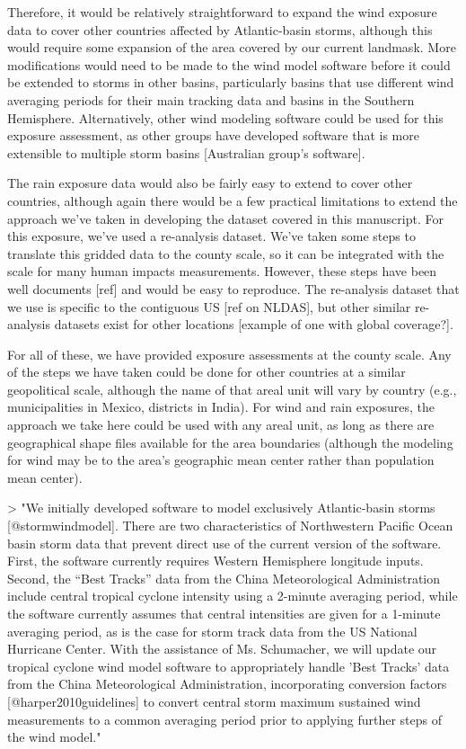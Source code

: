 Therefore, it would be relatively straightforward to expand the wind exposure
data to cover other countries affected by Atlantic-basin storms, although this
would require some expansion of the area covered by our current landmask. More
modifications would need to be made to the wind model software before it could
be extended to storms in other basins, particularly basins that use different
wind averaging periods for their main tracking data and basins in the Southern
Hemisphere. Alternatively, other wind modeling software could be used for this
exposure assessment, as other groups have developed software that is more
extensible to multiple storm basins [Australian group's software].

The rain exposure data would also be fairly easy to extend to cover other
countries, although again there would be a few practical limitations to extend
the approach we've taken in developing the dataset covered in this manuscript.
For this exposure, we've used a re-analysis dataset. We've taken some steps to
translate this gridded data to the county scale, so it can be integrated with
the scale for many human impacts measurements. However, these steps have been
well documents [ref] and would be easy to reproduce. The re-analysis dataset
that we use is specific to the contiguous US [ref on NLDAS], but other similar
re-analysis datasets exist for other locations [example of one with global
coverage?].

For all of these, we have provided exposure assessments at the county scale. Any
of the steps we have taken could be done for other countries at a similar
geopolitical scale, although the name of that areal unit will vary by country
(e.g., municipalities in Mexico, districts in India). For wind and rain
exposures, the approach we take here could be used with any areal unit, as long
as there are geographical shape files available for the area boundaries
(although the modeling for wind may be to the area's geographic mean center
rather than population mean center).

> "We initially developed software to model exclusively Atlantic-basin storms
[@stormwindmodel]. There are two characteristics of Northwestern Pacific Ocean
basin storm data that prevent direct use of the current version of the software.
First, the software currently requires Western Hemisphere longitude inputs.
Second, the ``Best Tracks'' data from the China Meteorological Administration
include central tropical cyclone intensity using a 2-minute averaging period,
while the software currently assumes that central intensities are given for a
1-minute averaging period, as is the case for storm track data from the US
National Hurricane Center. With the assistance of Ms. Schumacher, we will update
our tropical cyclone wind model software to appropriately handle 'Best Tracks'
data from the China Meteorological Administration, incorporating conversion
factors [@harper2010guidelines] to convert central storm maximum sustained wind
measurements to a common averaging period prior to applying further steps of the
wind model."

